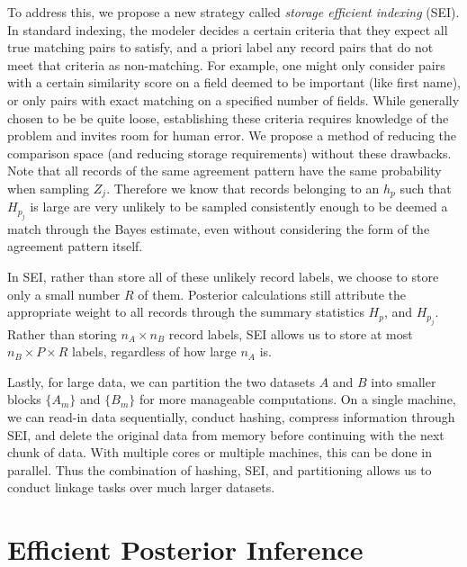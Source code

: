 \documentclass[12pt,letterpaper]{article}
\newcommand{\1}[1]{\mathbb{I}\!\left[#1\right]} %
\begin{document}
To address this, we propose a new strategy called \emph{storage	efficient indexing} (SEI). In standard indexing, the modeler decides a
certain criteria that they expect all true matching pairs to satisfy,
and a priori label any record pairs that do not meet that criteria as
non-matching. For example, one might only consider pairs with a certain
similarity score on a field deemed to be important (like first name), or
only pairs with exact matching on a specified number of fields. While
generally chosen to be be quite loose, establishing these criteria
requires knowledge of the problem and invites room for human error. We
propose a method of reducing the comparison space (and reducing storage
requirements) without these drawbacks. Note that all records of the same
agreement pattern have the same probability when sampling \(Z_j\).
Therefore we know that records belonging to an \(h_p\) such that
\(H_{p_j}\) is large are very unlikely to be sampled consistently enough
to be deemed a match through the Bayes estimate, even without
considering the form of the agreement pattern itself.

In SEI, rather than store all of these unlikely record labels, we choose
to store only a small number \(R\) of them. Posterior calculations still
attribute the appropriate weight to all records through the summary
statistics \(H_p\), and \(H_{p_j}\). Rather than storing
\(n_A \times n_B\) record labels, SEI allows us to store at most
\(n_B \times P \times R\) labels, regardless of how large \(n_A\) is.

Lastly, for large data, we can partition the two datasets \(A\) and
\(B\) into smaller blocks \(\{A_m\}\) and \(\{B_m\}\) for more
manageable computations. On a single machine, we can read-in data
sequentially, conduct hashing, compress information through SEI, and
delete the original data from memory before continuing with the next
chunk of data. With multiple cores or multiple machines, this can be
done in parallel. Thus the combination of hashing, SEI, and partitioning
allows us to conduct linkage tasks over much larger datasets.


\section{Efficient Posterior Inference}\label{sec:efficient-posterior}
\end{document}
